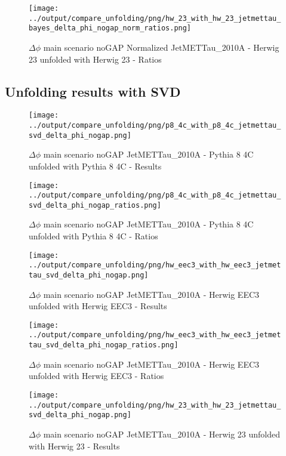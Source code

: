 \documentclass[11pt]{book}
\begin{document}
\begin{figure}[ht]
\centering
\texttt{[image: ../output/compare\_unfolding/png/hw\_23\_with\_hw\_23\_jetmettau\_bayes\_delta\_phi\_nogap\_norm\_ratios.png]}
\caption{$\Delta\phi$ main scenario noGAP Normalized JetMETTau\_2010A - Herwig 23 unfolded with Herwig 23 - Ratios}
\label{hw_23_hw_23_jetmettau_bayes_delta_phi_nogap_norm_b}
\end{figure}



\clearpage
\subsection{Unfolding results with SVD}

\begin{figure}[ht]
\centering
\texttt{[image: ../output/compare\_unfolding/png/p8\_4c\_with\_p8\_4c\_jetmettau\_svd\_delta\_phi\_nogap.png]}
\caption{$\Delta\phi$ main scenario noGAP JetMETTau\_2010A - Pythia 8 4C unfolded with Pythia 8 4C - Results}
\label{p8_p8_jetmettau_svd_delta_phi_nogap_a}
\end{figure}

\begin{figure}[ht]
\centering
\texttt{[image: ../output/compare\_unfolding/png/p8\_4c\_with\_p8\_4c\_jetmettau\_svd\_delta\_phi\_nogap\_ratios.png]}
\caption{$\Delta\phi$ main scenario noGAP JetMETTau\_2010A - Pythia 8 4C unfolded with Pythia 8 4C - Ratios}
\label{p8_p8_jetmettau_svd_delta_phi_nogap_b}
\end{figure}

\begin{figure}[ht]
\centering
\texttt{[image: ../output/compare\_unfolding/png/hw\_eec3\_with\_hw\_eec3\_jetmettau\_svd\_delta\_phi\_nogap.png]}
\caption{$\Delta\phi$ main scenario noGAP JetMETTau\_2010A - Herwig EEC3 unfolded with Herwig EEC3 - Results}
\label{hw_eec3_hw_eec3_jetmettau_svd_delta_phi_nogap_a}
\end{figure}

\begin{figure}[ht]
\centering
\texttt{[image: ../output/compare\_unfolding/png/hw\_eec3\_with\_hw\_eec3\_jetmettau\_svd\_delta\_phi\_nogap\_ratios.png]}
\caption{$\Delta\phi$ main scenario noGAP JetMETTau\_2010A - Herwig EEC3 unfolded with Herwig EEC3 - Ratios}
\label{hw_eec3_hw_eec3_jetmettau_svd_delta_phi_nogap_b}
\end{figure}

\begin{figure}[ht]
\centering
\texttt{[image: ../output/compare\_unfolding/png/hw\_23\_with\_hw\_23\_jetmettau\_svd\_delta\_phi\_nogap.png]}
\caption{$\Delta\phi$ main scenario noGAP JetMETTau\_2010A - Herwig 23 unfolded with Herwig 23 - Results}
\label{hw_23_hw_23_jetmettau_svd_delta_phi_nogap_a}
\end{figure}
\end{document}
